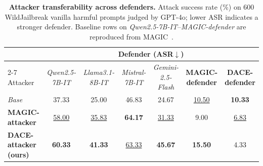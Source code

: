 \documentclass{article}
\newcommand{\method}{\textsc{DACE}\xspace}
\begin{document}




\begin{table}[t]
\centering
\caption{\textbf{Attacker transferability across defenders.} Attack success rate (\%) on 600 WildJailbreak vanilla harmful prompts judged by GPT-4o; lower ASR indicates a stronger defender. Baseline rows on \textit{Qwen2.5-7B-IT}--\textit{MAGIC-defender} are reproduced from MAGIC~\citep{magic2025}.}
\label{tab:attacker-transfer}
\setlength{\tabcolsep}{3pt}
\renewcommand{\arraystretch}{1.12}
\scriptsize
\begin{tabular}{lcccccc}
\toprule
& \multicolumn{6}{c}{Defender (ASR$\downarrow$)} \\
\cmidrule(lr){2-7}
Attacker & \textit{Qwen2.5-7B-IT} & \textit{Llama3.1-8B-IT} & \textit{Mistral-7B-IT} & \textit{Gemini-2.5-Flash} & \textbf{MAGIC-defender} & \textbf{\method-defender} \\
\midrule
\textit{Base}            & 37.33 & 25.00 & 46.83 & 24.67 & \underline{10.50} & \textbf{10.33} \\
\textbf{MAGIC-attacker}  & \underline{58.00} & \underline{35.83} & \textbf{64.17} & \underline{31.33} & 9.00  & \underline{6.83} \\
\cellcolor{cyan!15}\textbf{\method-attacker (ours)} & \cellcolor{cyan!15}\textbf{60.33} & \cellcolor{cyan!15}\textbf{41.33} & \cellcolor{cyan!15}\underline{63.33} & \cellcolor{cyan!15}\textbf{45.67} & \cellcolor{cyan!15}\textbf{15.50} & \cellcolor{cyan!15}4.33 \\
\bottomrule
\end{tabular}
\end{table}
\end{document}
